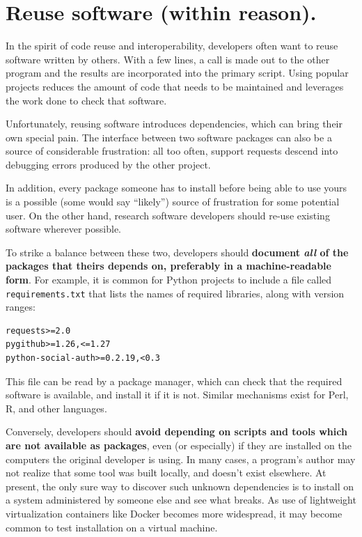 \documentclass[10pt,letterpaper]{article}
\begin{document}
\section{Reuse software (within reason).}

In the spirit of code reuse and interoperability, developers often want
to reuse software written by others. 
With a few lines, a call
is made out to the other program and the results are incorporated into the
primary script. Using popular projects reduces the amount of code that
needs to be maintained and leverages the work done to check that software.

Unfortunately, reusing software introduces dependencies, which can
bring their own special pain.  The interface between two software
packages can also be a source of considerable frustration: all too
often, support requests descend into debugging errors produced by the
other project.

In addition, every package someone has to install
before being able to use yours is a
possible (some would say ``likely'') source of frustration for some
potential user. On the other hand, research software developers should
re-use existing software wherever possible.

To strike a balance between
these two, developers should
\textbf{document \emph{all} of the packages that theirs depends on, preferably in a machine-readable form}.
For example, it is common for Python projects to include a file called
\texttt{requirements.txt} that lists the names of required libraries,
along with version ranges:

\begin{verbatim}
requests>=2.0
pygithub>=1.26,<=1.27
python-social-auth>=0.2.19,<0.3
\end{verbatim}

This file can be read by a package manager, which can check that the
required software is available, and install it if it is not. Similar
mechanisms exist for Perl, R, and other languages.

Conversely, developers should
\textbf{avoid depending on scripts and tools which are not available as packages},
even (or especially) if they are installed on the computers the original developer is using.
In many cases, a program's author may not realize that some tool was built locally, and
doesn't exist elsewhere. At present, the only sure way to discover such
unknown dependencies is to install on a system administered by someone
else and see what breaks. As use of lightweight
virtualization containers like Docker becomes more widespread, it may
become common to test installation on a virtual machine.
\end{document}
